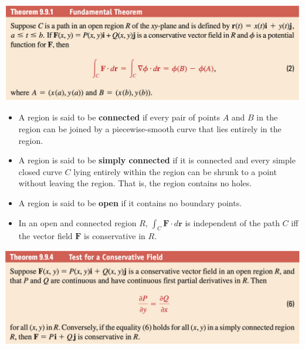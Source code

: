 \documentclass{article}
\begin{document}
\includegraphics[scale=0.443]{fundamental-theorem-of-line-integrals}

\begin{itemize}
  \item A region is said to be \textbf{connected} if every pair of points $A$ and $B$ in the region can be joined by a piecewise-smooth curve that lies entirely in the region.

  \item A region is said to be \textbf{simply connected} if it is connected and every simple closed curve $C$ lying entirely within the region can be shrunk to a point without leaving the region. That is, the region contains no holes.

  \item A region is said to be \textbf{open} if it contains no boundary points.

  \item In an open and connected region $R$, $\int_C \mathbf{F} \cdot d \mathbf{r}$ is independent of the path $C$ iff the vector field $\mathbf{F}$ is conservative in $R$.
\end{itemize}

\includegraphics[scale=0.443]{test-for-a-conservative-field}
\end{document}
